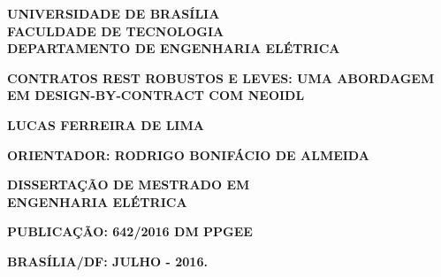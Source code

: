 
\thispagestyle{empty}
\setcounter{page}{1}
\begin{center}
{\normalsize {\bf UNIVERSIDADE DE BRAS\'{I}LIA\\
FACULDADE DE TECNOLOGIA\\
DEPARTAMENTO DE ENGENHARIA EL\'{E}TRICA }}

\vfill

{\large {\bf  CONTRATOS REST ROBUSTOS E LEVES: UMA ABORDAGEM EM
DESIGN-BY-CONTRACT COM NEOIDL }}


\vfill

{\large {\bf LUCAS FERREIRA DE LIMA}}

\vspace{20mm}

{\normalsize {\bf ORIENTADOR: RODRIGO BONIFÁCIO DE ALMEIDA }}

\vspace{20mm}

{\normalsize {\bf DISSERTAÇÃO DE MESTRADO EM\\
ENGENHARIA ELÉTRICA  }}

\vspace{10mm}

{\normalsize {\bf PUBLICAÇÃO: 642/2016 DM PPGEE}}


\vspace{10mm}

{\normalsize {\bf BRASÍLIA/DF: JULHO - 2016.    }  }
\end{center}

\pagebreak

\thispagestyle{empty}
\hspace{10mm}
\addtocounter{page}{-1}

\pagebreak

